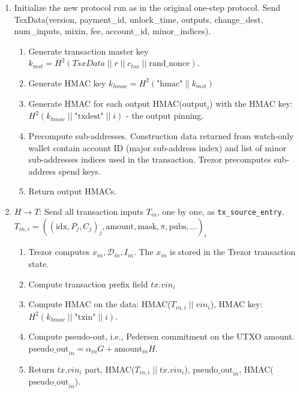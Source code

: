\documentclass[]{article}
\begin{document}
\begin{enumerate}
	\item Initialize the new protocol run as in the original one-step protocol. Send TsxData(version, payment\_id, unlock\_time, outputs, change\_dest, num\_inputs, mixin, fee, account\_id, minor\_indices).
	\begin{enumerate}
		\item Generate transaction master key $k_{mst} = H^2(TsxData \; || \; r \; || \; c_{tsx} \; || \; \text{rand\_nonce})$.
		
		\item Generate HMAC key $k_{hmac} = H^2\left(\text{"hmac"} \; || \; k_{mst}\right)$

		\item Generate HMAC for each output HMAC($\text{output}_i$) with the HMAC key: $H^2(k_{hmac} \; || \; \text{"txdest"} \; || \; i)$ - the output pinning.
		
		\item Precompute sub-addresses. Construction data returned from watch-only wallet contain account ID (major sub-address index) and list of minor sub-addresses indices used in the transaction. Trezor precomputes sub-address spend keys.
		
		\item Return output HMACs.
	\end{enumerate} 

	\item $H \rightarrow T$: Send all transaction inputs $T_{in}$, one by one, as \verb|tx_source_entry|.\\
	$T_{in,i} = ((\text{idx}, P_j,C_j)_j, \text{amount}, \text{mask}, \pi, \text{pubs}, \dots)_i$
	\begin{enumerate}
		\item Trezor computes $x_{in}, \mathcal{D}_{in}, I_{in}$. The $x_{in}$ is stored in the Trezor transaction state.
		
		\item Compute transaction prefix field $tx.vin_i$
		
		\item Compute HMAC on the data: HMAC($T_{in,i} \; || \; vin_i$), HMAC key: $H^2(k_{hmac} \; || \; \text{"txin"} \; || \; i)$.
		
		\item Compute pseudo-out, i.e., Pedersen commitment on the UTXO amount. $ \text{pseudo\_out}_{in} = \alpha_{in} G + \text{amount}_{in} H$.
		
		\item Return $tx.vin_i$ part, HMAC($T_{in,i} \; || \; tx.vin_i$), $\text{pseudo\_out}_{in}$, HMAC($\text{pseudo\_out}_{in}$).
	\end{enumerate} 


\end{enumerate}
\end{document}
